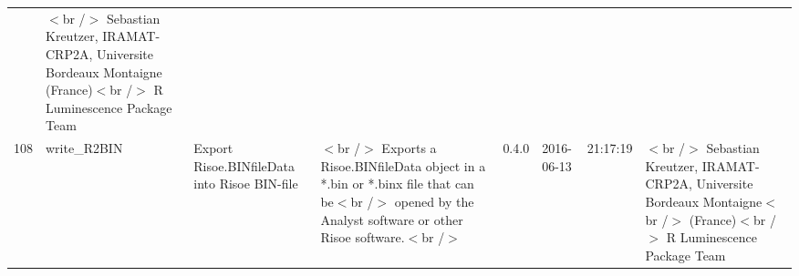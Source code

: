 \begin{table}[ht]
\begin{tabular}{rlllllll}
 & $<$br /$>$ Sebastian Kreutzer, IRAMAT-CRP2A, Universite Bordeaux Montaigne (France)$<$br /$>$  R Luminescence Package Team \\ 
  108 & write\_R2BIN & Export Risoe.BINfileData into Risoe BIN-file & $<$br /$>$ Exports a Risoe.BINfileData object in a *.bin or *.binx file that can be$<$br /$>$ opened by the Analyst software or other Risoe software.$<$br /$>$ & 0.4.0 & 2016-06-13 & 21:17:19
 & $<$br /$>$ Sebastian Kreutzer, IRAMAT-CRP2A, Universite Bordeaux Montaigne$<$br /$>$ (France)$<$br /$>$  R Luminescence Package Team \\ 
   \hline
\end{tabular}
\end{table}

